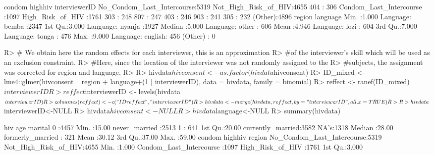 \documentclass[
]{jss}
\begin{document}
\begin{CodeChunk}
\begin{CodeOutput}
                        condom                     highhiv     interviewerID 
 No_Condom_Last_Intercourse:5319   Not_High_Risk_of_HIV:4655   404    : 306  
 Condom_Last_Intercourse   :1097   High_Risk_of_HIV    :1761   303    : 248  
                                                               807    : 247  
                                                               403    : 246  
                                                               903    : 241  
                                                               305    : 232  
                                                               (Other):4896  
     region                   language   
 Min.   :1.000   Language: bemba  :2347  
 1st Qu.:3.000   Language: nyanja :1927  
 Median :5.000   Language: other  : 606  
 Mean   :4.946   Language: lozi   : 604  
 3rd Qu.:7.000   Language: tonga  : 476  
 Max.   :9.000   Language: english: 456  
                 (Other)          :   0  
\end{CodeOutput}
\begin{CodeInput}
R> #  We obtain here the random effects for each interviewer, this is an approximation 
R> #of the interviewer's skill which will be used as an exclusion constraint. 
R> #Here, since the location of the interviewer was not randomly assigned to the 
R> #subjects, the assignment was corrected for region and language. 
R> 
R> hivdata$hivconsent <- as.factor(hivdata$hivconsent)
R> ID_mixed <- lme4::glmer(hivconsent ~ region + language+(1 | interviewerID), data = hivdata, family = binomial)
R> reffect  <- ranef(ID_mixed)$interviewerID
R> reffect$interviewerID <- levels(hivdata$interviewerID)
R> colnames(reffect)     <- c("IDreffect","interviewerID")
R> hivdata  <-  merge(hivdata, reffect, by="interviewerID", all.x=TRUE)
R> 
R> hivdata$interviewerID<-NULL
R> hivdata$hivconsent<-NULL
R> hivdata$language<-NULL
R> summary(hivdata)
\end{CodeInput}
\begin{CodeOutput}
   hiv            age                     marital    
 0   :4457   Min.   :15.00   never_married    :2513  
 1   : 641   1st Qu.:20.00   currently_married:3582  
 NA's:1318   Median :28.00   formerly_married : 321  
             Mean   :30.12                           
             3rd Qu.:37.00                           
             Max.   :59.00                           
                        condom                     highhiv         region     
 No_Condom_Last_Intercourse:5319   Not_High_Risk_of_HIV:4655   Min.   :1.000  
 Condom_Last_Intercourse   :1097   High_Risk_of_HIV    :1761   1st Qu.:3.000  

\end{CodeOutput}
\end{CodeChunk}
\end{document}
